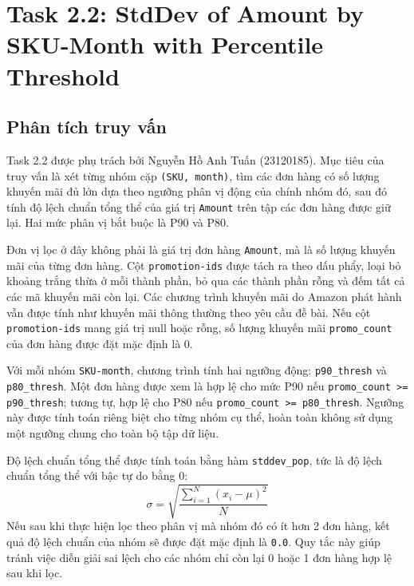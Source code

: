 \section{Task 2.2: StdDev of Amount by SKU-Month with Percentile Threshold}

\subsection{Phân tích truy vấn}
Task 2.2 được phụ trách bởi Nguyễn Hồ Anh Tuấn (23120185). Mục tiêu của truy vấn là xét từng nhóm cặp \texttt{(SKU, month)}, tìm các đơn hàng có số lượng khuyến mãi đủ lớn dựa theo ngưỡng phân vị động của chính nhóm đó, sau đó tính độ lệch chuẩn tổng thể của giá trị \texttt{Amount} trên tập các đơn hàng được giữ lại. Hai mức phân vị bắt buộc là P90 và P80.

Đơn vị lọc ở đây không phải là giá trị đơn hàng \texttt{Amount}, mà là số lượng khuyến mãi của từng đơn hàng. Cột \texttt{promotion-ids} được tách ra theo dấu phẩy, loại bỏ khoảng trắng thừa ở mỗi thành phần, bỏ qua các thành phần rỗng và đếm tất cả các mã khuyến mãi còn lại. Các chương trình khuyến mãi do Amazon phát hành vẫn được tính như khuyến mãi thông thường theo yêu cầu đề bài. Nếu cột \texttt{promotion-ids} mang giá trị null hoặc rỗng, số lượng khuyến mãi \texttt{promo\_count} của đơn hàng được đặt mặc định là 0.

Với mỗi nhóm \texttt{SKU-month}, chương trình tính hai ngưỡng động: \texttt{p90\_thresh} và \texttt{p80\_thresh}. Một đơn hàng được xem là hợp lệ cho mức P90 nếu \texttt{promo\_count >= p90\_thresh}; tương tự, hợp lệ cho P80 nếu \texttt{promo\_count >= p80\_thresh}. Ngưỡng này được tính toán riêng biệt cho từng nhóm cụ thể, hoàn toàn không sử dụng một ngưỡng chung cho toàn bộ tập dữ liệu.

Độ lệch chuẩn tổng thể được tính toán bằng hàm \texttt{stddev\_pop}, tức là độ lệch chuẩn tổng thể với bậc tự do bằng 0:
\[
    \sigma = \sqrt{\frac{\sum_{i=1}^{N}(x_i-\mu)^2}{N}}
\]
Nếu sau khi thực hiện lọc theo phân vị mà nhóm đó có ít hơn 2 đơn hàng, kết quả độ lệch chuẩn của nhóm sẽ được đặt mặc định là \texttt{0.0}. Quy tắc này giúp tránh việc diễn giải sai lệch cho các nhóm chỉ còn lại 0 hoặc 1 đơn hàng hợp lệ sau khi lọc.

